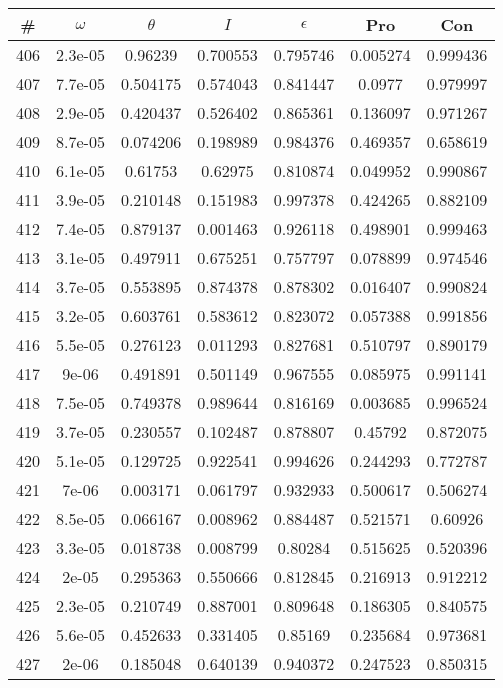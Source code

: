 \newpage
\begin{table}
\begin{tabular}{c|c|c|c|c|c|c}
\# & $\omega$ & $\theta$ & $I$ & $\epsilon$ & Pro & Con\\
\hline
406 & 2.3e-05 & 0.96239 & 0.700553 & 0.795746 & 0.005274 & 0.999436\\
407 & 7.7e-05 & 0.504175 & 0.574043 & 0.841447 & 0.0977 & 0.979997\\
408 & 2.9e-05 & 0.420437 & 0.526402 & 0.865361 & 0.136097 & 0.971267\\
409 & 8.7e-05 & 0.074206 & 0.198989 & 0.984376 & 0.469357 & 0.658619\\
410 & 6.1e-05 & 0.61753 & 0.62975 & 0.810874 & 0.049952 & 0.990867\\
411 & 3.9e-05 & 0.210148 & 0.151983 & 0.997378 & 0.424265 & 0.882109\\
412 & 7.4e-05 & 0.879137 & 0.001463 & 0.926118 & 0.498901 & 0.999463\\
413 & 3.1e-05 & 0.497911 & 0.675251 & 0.757797 & 0.078899 & 0.974546\\
414 & 3.7e-05 & 0.553895 & 0.874378 & 0.878302 & 0.016407 & 0.990824\\
415 & 3.2e-05 & 0.603761 & 0.583612 & 0.823072 & 0.057388 & 0.991856\\
416 & 5.5e-05 & 0.276123 & 0.011293 & 0.827681 & 0.510797 & 0.890179\\
417 & 9e-06 & 0.491891 & 0.501149 & 0.967555 & 0.085975 & 0.991141\\
418 & 7.5e-05 & 0.749378 & 0.989644 & 0.816169 & 0.003685 & 0.996524\\
419 & 3.7e-05 & 0.230557 & 0.102487 & 0.878807 & 0.45792 & 0.872075\\
420 & 5.1e-05 & 0.129725 & 0.922541 & 0.994626 & 0.244293 & 0.772787\\
421 & 7e-06 & 0.003171 & 0.061797 & 0.932933 & 0.500617 & 0.506274\\
422 & 8.5e-05 & 0.066167 & 0.008962 & 0.884487 & 0.521571 & 0.60926\\
423 & 3.3e-05 & 0.018738 & 0.008799 & 0.80284 & 0.515625 & 0.520396\\
424 & 2e-05 & 0.295363 & 0.550666 & 0.812845 & 0.216913 & 0.912212\\
425 & 2.3e-05 & 0.210749 & 0.887001 & 0.809648 & 0.186305 & 0.840575\\
426 & 5.6e-05 & 0.452633 & 0.331405 & 0.85169 & 0.235684 & 0.973681\\
427 & 2e-06 & 0.185048 & 0.640139 & 0.940372 & 0.247523 & 0.850315\\

\end{tabular}
\end{table}
